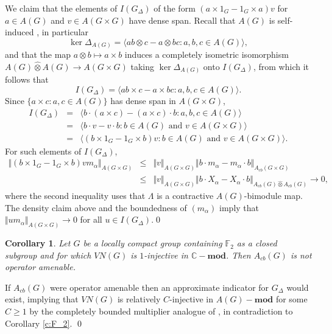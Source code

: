\documentclass[preprint,12pt]{elsarticle}
\newtheorem{cor}[thm]{Corollary}
\begin{document}
\begin{pf}
We claim that the elements of $I(G_{\Delta})$ of the form
$(a\times1_{G}-1_{G}\times a)v$ for $a\in A(G)$
and $v\in A(G\times G)$ have dense span. Recall that $A(G)$
is self-induced \cite{D4}, in particular \[
\ker\Delta_{A(G)}=\langle ab\otimes c-a\otimes bc:a,b,c\in A(G)\rangle ,\]
and that the map $a\otimes b\mapsto a\times b$ induces a completely
isometric isomorphism $A(G)\widehat{\otimes}A(G)\rightarrow A(G\times G)$
taking $\ker\Delta_{A(G)}$ onto $I(G_{\Delta})$,
from which it follows that \[
I(G_{\Delta})=\langle ab\times c-a\times bc:a,b,c\in A(G)\rangle .\]
Since $\{ a\times c:a,c\in A(G)\} $ has dense
span in $A(G\times G)$, \begin{eqnarray*}
I(G_{\Delta}) & = & \langle b\cdot(a\times c)-(a\times c)\cdot b:a,b,c\in A(G)\rangle \\
 & = & \langle b\cdot v-v\cdot b:b\in A(G)\mbox{ and }v\in A(G\times G)\rangle \\
 & = & \langle (b\times1_{G}-1_{G}\times b)v:b\in A(G)\mbox{ and }v\in A(G\times G)\rangle .\end{eqnarray*}
For such elements of $I(G_{\Delta})$,\begin{eqnarray*}
\Vert (b\times1_{G}-1_{G}\times b)vm_{\alpha}\Vert _{A(G\times G)} & \leq & \Vert v\Vert _{A(G\times G)}\Vert b\cdot m_{\alpha}-m_{\alpha}\cdot b\Vert _{A_{cb}(G\times G)}\\
 & \leq & \Vert v\Vert _{A(G\times G)}\Vert b\cdot X_{\alpha}-X_{\alpha}\cdot b\Vert _{A_{cb}(G)\widehat{\otimes}A_{cb}(G)}\rightarrow0,\end{eqnarray*}
where the second inequality uses that $\Lambda$ is a contractive $A(G)$-bimodule
map. The density claim above and the boundedness of $(m_{\alpha})$ imply that $\Vert um_{\alpha}\Vert _{A(G\times G)}\rightarrow0$
for all $u\in I(G_{\Delta})$.\qed\end{pf}
\begin{cor}\label{c:Acbopamen}
Let $G$ be a locally compact group containing $\mathbb{F}_{2}$ as
a closed subgroup and for which $VN(G)$ is $1$-injective
in $\mathbb{C}-\mathbf{mod}$. Then $A_{cb}(G)$ is not
operator amenable.\end{cor}
\begin{pf}
If $A_{cb}(G)$ were operator amenable then an approximate
indicator for $G_{\Delta}$ would exist, implying that $VN(G)$
is relatively $C$-injective in $A(G)-\mathbf{mod}$ for some $C\geq 1$ by
the completely bounded multiplier analogue of \cite[Proposition 2.3]{ARS}, in contradiction
to Corollary \ref{c:F_2}.
\qed\end{pf}
\end{document}
